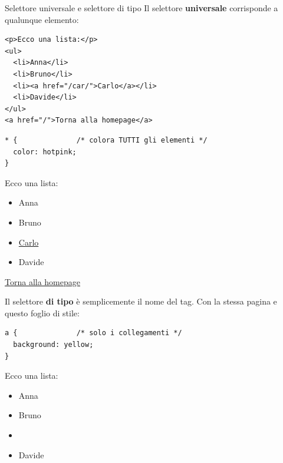 \begin{esempio}{Selettore universale e selettore di tipo}
Il selettore \textbf{universale} \code{*} corrisponde a qualunque elemento:

\begin{affianco}[0.5]
\begin{lstlisting}[style=html, name=lista.html]
<p>Ecco una lista:</p>
<ul>
  <li>Anna</li>
  <li>Bruno</li>
  <li><a href="/car/">Carlo</a></li>
  <li>Davide</li>
</ul>
<a href="/">Torna alla homepage</a>
\end{lstlisting}
\begin{lstlisting}[style=css, name=lista.css]
* {              /* colora TUTTI gli elementi */
  color: hotpink;
}
\end{lstlisting}
\risultato
\begin{browser}
  \color{css-hotpink}
  Ecco una lista:\\[3pt]
  \begin{itemize}[leftmargin=1.8em, itemsep=0pt, topsep=0pt, parsep=0pt]
    \item Anna
    \item Bruno
    \item \uline{Carlo}
    \item Davide
  \end{itemize}
  \vspace{3pt}
  \uline{Torna alla homepage}
\end{browser}
\end{affianco}

Il selettore \textbf{di tipo} è semplicemente il nome del tag. Con la stessa
pagina e questo foglio di stile:

\begin{affianco}[0.5]
\begin{lstlisting}[style=css, name=lista.css]
a {              /* solo i collegamenti */
  background: yellow;
}
\end{lstlisting}
\risultato
\begin{browser}
  Ecco una lista:\\[3pt]
  \begin{itemize}[leftmargin=1.8em, itemsep=0pt, topsep=0pt, parsep=0pt]
    \item Anna
    \item Bruno
    \item \colorbox{css-yellow}{}
    \item Davide
  \end{itemize}
  \vspace{3pt}
  \colorbox{css-yellow}{}
\end{browser}
\end{affianco}
\end{esempio}

